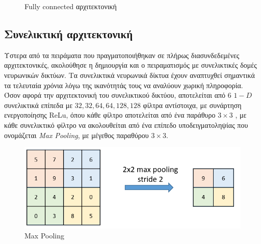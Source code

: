 \begin{figure}[h]
\caption{Fully connected αρχιτεκτονική}
\label{fig:FC_Arch}
\end{figure}


\bigskip
\subsection{Συνελικτική αρχιτεκτονική}

Υστερα από τα πειράματα που πραγματοποιήθηκαν σε πλήρως διασυνδεδεμένες αρχιτεκτονικές, ακολούθησε η δημιουργία και ο πειραματισμός με συνελικτικές δομές νευρωνικών δικτύων. Τα συνελικτικά νευρωνικά δίκτυα έχουν αναπτυχθεί σημαντικά τα τελευταία χρόνια λόγω της ικανότητάς τους να αναλύουν χωρική πληροφορία. Όσον αφορά την αρχιτεκτονική του συνελικτικού δικτύου, αποτελείται από 6 $1-D$ συνελικτικά επίπεδα με $32,32,64,64,128,128$ φίλτρα αντίστοιχα, με συνάρτηση ενεργοποίησης ReLu, όπου κάθε φίλτρο αποτελείται από ένα παράθυρο $3 \times 3$ , με κάθε συνελικτικό φίλτρο να ακολουθείται από ένα επίπεδο υποδειγματοληψίας που ονομάζεται \textit{Max Pooling}, με μέγεθος παραθύρου $3 \times 3$. 

\medskip
\begin{figure}[h]
  \centering
  \includegraphics[scale=0.65]{images/maxpool.png}
  \caption{Max Pooling}
  \label{fig:maxpool}
\end{figure}

